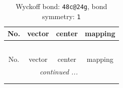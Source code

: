 \documentclass[fleqn,8pt]{jsarticle}
\begin{document}
\renewcommand{\arraystretch}{1.2}
\begin{longtable}{cccc}
\caption{Wyckoff bond: {\tt 48c@24g}, bond symmetry: {\tt 1}}
 \\
 \hline \hline
No. & vector & center & mapping \\ \hline \endfirsthead

\multicolumn{3}{l}{\tablename\ \thetable{}} \\
 \hline \hline
No. & vector & center & mapping \\ \hline \endhead

 \hline \hline
\multicolumn{3}{r}{\footnotesize\it continued ...} \\ \endfoot

 \hline \hline
\multicolumn{3}{r}{} \\ \endlastfoot


\end{longtable}
\end{document}
